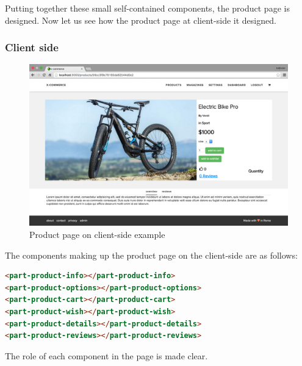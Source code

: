Putting together these small self-contained components, the product page is designed. Now let us see how the product page at client-side it designed.
\subsubsection{Client side}
\begin{figure}[htb]
\centering
\includegraphics[width=1.0\linewidth]{images/chapter4/product-page-ex3.png}\hfill
\caption[Product page on client-side]{Product page on client-side example}
\label{fig:design_page_prod_cli}
\end{figure}
The components making up the product page on the client-side are as follows:
\begin{lstlisting}[language=html]
<part-product-info></part-product-info>
<part-product-options></part-product-options>
<part-product-cart></part-product-cart>
<part-product-wish></part-product-wish>
<part-product-details></part-product-details>
<part-product-reviews></part-product-reviews>
\end{lstlisting}
The role of each component in the page is made clear.